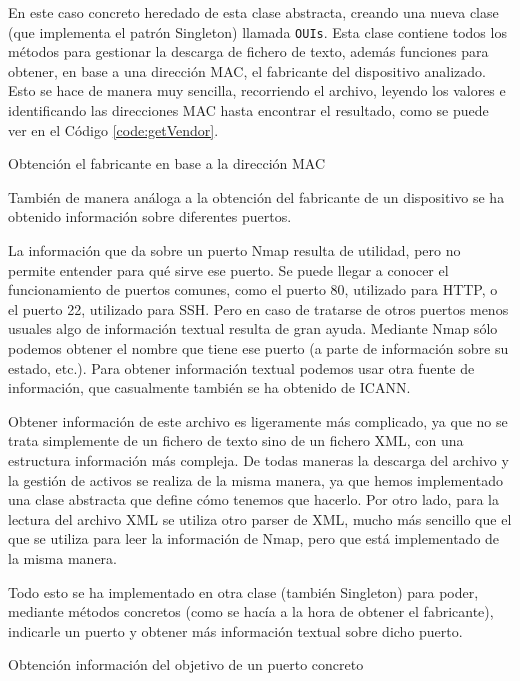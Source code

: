 En este caso concreto heredado de esta clase abstracta, creando una nueva clase (que implementa el patrón Singleton) llamada \texttt{OUIs}. Esta clase contiene todos los métodos para gestionar la descarga de fichero de texto, además funciones para obtener, en base a una dirección MAC, el fabricante del dispositivo analizado. Esto se hace de manera muy sencilla, recorriendo el archivo, leyendo los valores e identificando las direcciones MAC hasta encontrar el resultado, como se puede ver en el Código \ref{code:getVendor}.

\begin{code}
	\caption{Obtención el fabricante en base a la dirección MAC}
	\label{code:getVendor}
	
\end{code}

También de manera análoga a la obtención del fabricante de un dispositivo se ha obtenido información sobre diferentes puertos.

La información que da sobre un puerto Nmap resulta de utilidad, pero no permite entender para qué sirve ese puerto. Se puede llegar a conocer el funcionamiento de puertos comunes, como el puerto 80, utilizado para HTTP, o el puerto 22, utilizado para SSH. Pero en caso de tratarse de otros puertos menos usuales algo de información textual resulta de gran ayuda. Mediante Nmap sólo podemos obtener el nombre que tiene ese puerto (a parte de información sobre su estado, etc.). Para obtener información textual podemos usar otra fuente de información, que casualmente también se ha obtenido de ICANN. 

Obtener información de este archivo es ligeramente más complicado, ya que no se trata simplemente de un fichero de texto sino de un fichero XML, con una estructura información más compleja. De todas maneras la descarga del archivo y la gestión de activos se realiza de la misma manera, ya que hemos implementado una clase abstracta que define cómo tenemos que hacerlo. Por otro lado, para la lectura del archivo XML se utiliza otro parser de XML, mucho más sencillo que el que se utiliza para leer la información de Nmap, pero que está implementado de la misma manera.

Todo esto se ha implementado en otra clase (también Singleton) para poder, mediante métodos concretos (como se hacía a la hora de obtener el fabricante), indicarle un puerto y obtener más información textual sobre dicho puerto.

%	
\begin{code}
	\caption{Obtención información del objetivo de un puerto concreto}
\end{code}


